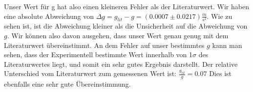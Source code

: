 \documentclass[twoside]{protokoll}
\begin{document}
Unser Wert für g hat also einen kleineren Fehler als der Literaturwert. 
Wir haben eine absolute Abweichung von $\Delta g = g_{lit} - g = (0.0007 \pm 0.0217) \frac{m}{s^2}$.
Wie zu sehen ist, ist die Abweichung kleiner als die Unsicherheit auf die Abweichung von $g$.
Wir können also davon ausgehen, dass unser Wert genau genug mit dem Literaturwert übereinstimmt.
An dem Fehler auf unser bestimmtes $g$ kann man sehen, dass der Experimentell bestimmte Wert innerhalb von 1$\sigma$ des Literaturwertes liegt, und somit ein sehr gutes Ergebnis darstellt.
Der relative Unterschied vom Literaturwert zum gemessenen Wert ist: $\frac{g_{lit}}{g} =  0.07$ \textperthousand
Dies ist ebenfalls eine sehr gute Übereinstimmung.
\end{document}
